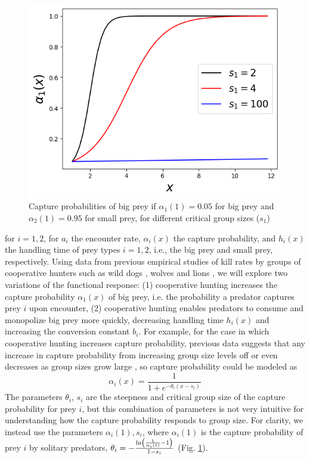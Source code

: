 \begin{figure}
\begin{center}
\includegraphics[width=.4\textwidth, trim={0 0.3cm 0 0},clip]{Figures/capturerate_bigprey.png}
\end{center}
\caption{Capture probabilities of big prey if $\alpha_1(1)= 0.05$ for big prey and $\alpha_2(1) = 0.95$ for small prey, for different critical group sizes ($s_1$)}
\label{fig_capture_rates}
\end{figure}
for $i = 1,2$, for $a_i$ the encounter rate, $\alpha_i(x)$ the capture probability, and $h_i(x)$ the handling time of prey types $i=1,2$, i.e., the big prey and small prey, respectively. Using data from previous empirical studies of kill rates by groups of cooperative hunters such as wild dogs \cite{creel_communal_1995, fanshawe_factors_1993}, wolves \cite{zimmermann_predatordependent_2015, macnulty_influence_2014} and lions \cite{caraco_ecological_1975, clark_lazy_1987}, we will explore two variations of the functional response: (1) cooperative hunting increases the capture probability $\alpha_1(x)$ of big prey, i.e. the probability a predator captures prey $i$ upon encounter, (2) cooperative hunting enables predators to consume and monopolize big prey more quickly, decreasing handling time $h_i(x)$ and increasing the conversion constant $b_i$. For example, for the case in which cooperative hunting increases capture probability, previous data suggests that any increase in capture probability from increasing group size levels off or even decreases as group sizes grow large \cite[e.g.]{macnulty_influence_2014}, so capture probability could be modeled as 
\begin{equation}
\alpha_i(x) = \frac{1}{1 + e^{-\theta_i(x - s_i)}}  
\end{equation}
The parameters $\theta_i$, $s_i$ are the steepness and critical group size of the capture probability for prey $i$, but this combination of parameters is not very intuitive for understanding how the capture probability responds to group size. For clarity, we instead use the parameters $\alpha_i(1), s_i$, where $\alpha_{i}(1)$ is the capture probability of prey $i$ by solitary predators, $\theta_i = - \frac{\ln\left(  \frac{1}{\alpha_i(1)} -1  \right)}{1 - s_i}$ (Fig. \ref{fig_capture_rates}).



